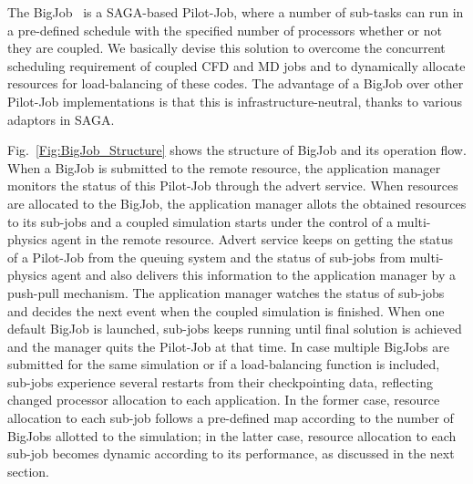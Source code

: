 \documentclass[preprint,12pt]{elsarticle}
\newcommand{\skonote}[1]{ {\textcolor{blue} { ***Jeff: #1 }}}
\newcommand{\skonote}[1]{}
\begin{document}

The BigJob~\cite{saga_royalsoc} is a SAGA-based Pilot-Job, where a number of sub-tasks can run in a pre-defined schedule with the specified number of processors whether or not they are coupled. We basically devise this solution to overcome the concurrent scheduling requirement of coupled CFD and MD jobs and to dynamically allocate resources for load-balancing of these codes. The advantage of a BigJob over other Pilot-Job implementations is that this is infrastructure-neutral, thanks to various adaptors in SAGA.




Fig.~\ref{Fig:BigJob_Structure} shows the structure of BigJob and its operation flow. When a BigJob is submitted to the remote resource, the application manager monitors the status of this Pilot-Job through the advert service. When resources are allocated to the BigJob, the application manager allots the obtained resources to its sub-jobs and a coupled simulation starts under the control of a multi-physics agent in the remote resource. Advert service keeps on getting the status of a Pilot-Job from the queuing system and the status of sub-jobs from multi-physics agent and also delivers this information to the application manager by a push-pull mechanism. The application manager watches the status of sub-jobs and decides the next event when the coupled simulation is finished. When one default BigJob is launched, sub-jobs keeps running until final solution is achieved and the manager quits the Pilot-Job at that time. In case multiple BigJobs are submitted for the same simulation or if a load-balancing function is included, sub-jobs experience several restarts from their checkpointing data, reflecting changed processor allocation to each application. In the former case, resource allocation to each sub-job follows a pre-defined map according to the number of BigJobs allotted to the simulation; in the latter case, resource allocation to each sub-job becomes dynamic according to its performance, as discussed in the next section.
\end{document}
